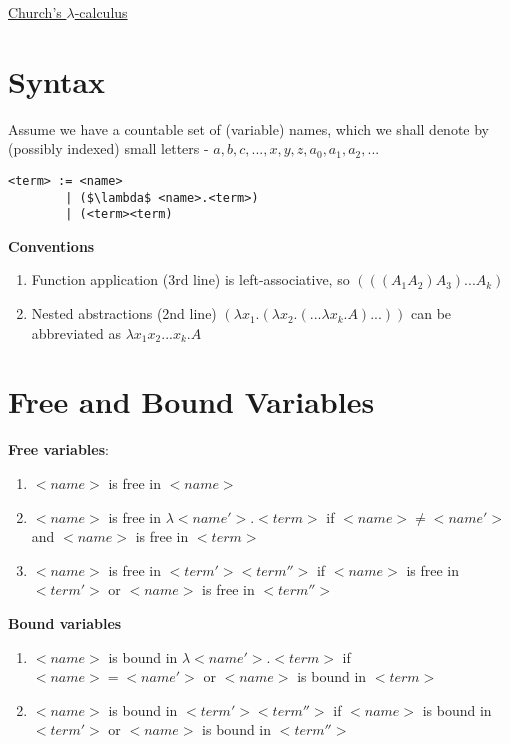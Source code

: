 \documentclass{article}[18pt]
\begin{document}
\begin{center}
\underline{\huge Church's $\lambda$-calculus}
\end{center}
\section{Syntax}
Assume we have a countable set of (variable) names, which we shall denote by (possibly indexed) small letters - $a,b,c, ..., x,y,z,a_0,a_1,a_2,...$
\begin{defin}
\begin{lstlisting}[language=Lambda]
<term> := <name>
	    | ($\lambda$ <name>.<term>)
	    | (<term><term)
\end{lstlisting}
\end{defin}
\textbf{Conventions}
\begin{enumerate}
	\item Function application (3rd line) is left-associative, so $(((A_1A_2)A_3)...A_k)$
	\item Nested abstractions (2nd line) $(\lambda x_1.(\lambda x_2.(...\lambda x_k.A)...))$ can be abbreviated as $\lambda x_1x_2...x_k.A$
\end{enumerate}
\section{Free and Bound Variables}
\textbf{Free variables}:
\begin{enumerate}
	\item $<name>$ is free in $<name>$
	\item $<name>$ is free in $\lambda <name'>.<term>$ if $<name>\neq <name'>$ and $<name>$ is free in $<term>$
	\item $<name>$ is free in $<term'><term''>$ if $<name>$ is free in $<term'>$ or $<name>$ is free in $<term''>$
\end{enumerate}
\textbf{Bound variables}
\begin{enumerate}
	\item $<name>$ is bound in $\lambda<name'>.<term>$ if $<name>=<name'>$ or $<name>$ is bound in $<term>$
	\item $<name>$ is bound in $<term'><term''>$ if $<name>$ is bound in $<term'>$ or $<name>$ is bound in $<term''>$
\end{enumerate}
\end{document}
